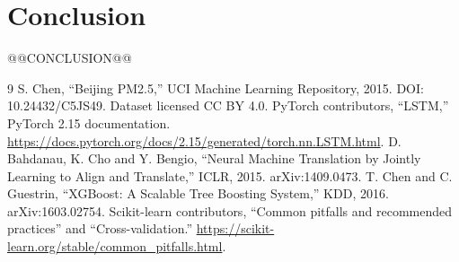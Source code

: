 \documentclass[conference]{IEEEtran}
\begin{document}
\section{Conclusion}
@@CONCLUSION@@

\begin{thebibliography}{9}
 S. Chen, ``Beijing PM2.5,'' UCI Machine Learning Repository, 2015. DOI: 10.24432/C5JS49. Dataset licensed CC BY 4.0.
 PyTorch contributors, ``LSTM,'' PyTorch 2.15 documentation. \url{https://docs.pytorch.org/docs/2.15/generated/torch.nn.LSTM.html}.
 D. Bahdanau, K. Cho and Y. Bengio, ``Neural Machine Translation by Jointly Learning to Align and Translate,'' ICLR, 2015. arXiv:1409.0473.
 T. Chen and C. Guestrin, ``XGBoost: A Scalable Tree Boosting System,'' KDD, 2016. arXiv:1603.02754.
 Scikit-learn contributors, ``Common pitfalls and recommended practices'' and ``Cross-validation.'' \url{https://scikit-learn.org/stable/common_pitfalls.html}.
\end{thebibliography}
\end{document}
